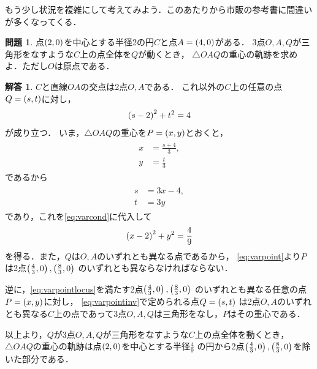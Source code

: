\documentclass[11pt,a4paper]{ltjsarticle}
\newcommand*{\coord}[1]{\paren{#1}}
\theoremstyle{definition}
\newtheorem{que}[dfn]{問題}
\newtheorem{ans}[dfn]{解答}
\begin{document}
もう少し状況を複雑にして考えてみよう．このあたりから市販の参考書に間違いが多くなってくる．

\begin{que} \label{que:varpoint}
	点$\coord{2,0}$を中心とする半径2の円$C$と点$A = \coord{4,0}$がある．
	3点$O,A,Q$が三角形をなすような$C$上の点全体を$Q$が動くとき，
	$\triangle OAQ$の重心の軌跡を求めよ．ただし$O$は原点である．
\end{que}

\begin{ans} \label{ans:varpoint}
	$C$と直線$OA$の交点は2点$O, A$である．
	これ以外の$C$上の任意の点$Q = \coord{s, t}$に対し，
	\begin{align}
		\paren{s - 2}^2 + t^2 = 4
		\label{eq:varcond}
	\end{align}
	が成り立つ．
	いま，$\triangle OAQ$の重心を$P = \coord{x, y}$とおくと，
	\begin{align}
		\begin{aligned}
			x & = \frac{s + 4}{3}, \\
			y & = \frac{t}{3}
		\end{aligned}
		\label{eq:varpoint}
	\end{align}
	であるから
	\begin{align}
		\begin{aligned}
			s & = 3x - 4, \\
			t & = 3y
		\end{aligned}
		\label{eq:varpointinv}
	\end{align}
	であり，これを\cref{eq:varcond}に代入して
	\begin{align}
		\paren{x - 2}^2 + y^2 = \frac{4}{9}
		\label{eq:varpointlocus}
	\end{align}
	を得る．また，$Q$は$O,A$のいずれとも異なる点であるから，
	\cref{eq:varpoint}より$P$は2点$\coord{\frac{4}{3}, 0}, \coord{\frac{8}{3}, 0}$
	のいずれとも異ならなければならない．

	逆に，\cref{eq:varpointlocus}を満たす2点$\coord{\frac{4}{3}, 0}, \coord{\frac{8}{3}, 0}$
	のいずれとも異なる任意の点$P = \coord{x,y}$に対し，
	\cref{eq:varpointinv}で定められる点$Q = \coord{s, t}$
	は2点$O, A$のいずれとも異なる$C$上の点であって3点$O,A,Q$は三角形をなし，$P$はその重心である．

	以上より，$Q$が3点$O,A,Q$が三角形をなすような$C$上の点全体を動くとき，
	$\triangle OAQ$の重心の軌跡は点$\coord{2, 0}$を中心とする半径$\frac{4}{9}$
	の円から2点$\coord{\frac{4}{3}, 0}, \coord{\frac{8}{3}, 0}$を除いた部分である．
\end{ans}
\end{document}
